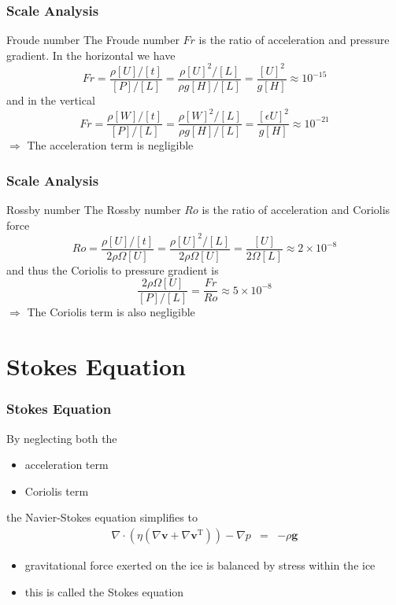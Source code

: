 \documentclass[hide notes,intlimits]{beamer}
\begin{document}
\begin{frame}
  \frametitle{Scale Analysis}
  \begin{block}{Froude number}
    The \alert{Froude number $Fr$} is the ratio of acceleration and pressure gradient. In the horizontal we have
  \begin{equation*}
    Fr = \frac{\rho[U]/[t]}{[P]/[L]} = \frac{\rho[U]^{2}/[L]}{\rho g [H]/[L]} = \frac{[U]^{2}}{g[H]} \approx 10^{-15}
  \end{equation*}
  and in the vertical
  \begin{equation*}
    Fr = \frac{\rho[W]/[t]}{[P]/[L]} = \frac{\rho[W]^{2}/[L]}{\rho g [H]/[L]} = \frac{[\epsilon U]^{2}}{g[H]} \approx 10^{-21}
  \end{equation*}
  $\Rightarrow$ The \alert{acceleration term} is \alert{negligible}
  \end{block}
\end{frame}


\begin{frame}
  \frametitle{Scale Analysis}
  \begin{block}{Rossby number}
    The \alert{Rossby number $Ro$} is the ratio of acceleration and Coriolis force
  \begin{equation*}
    Ro = \frac{\rho[U]/[t]}{2\rho\Omega[U]} = \frac{\rho[U]^{2}/[L]}{2\rho\Omega[U]} = \frac{[U]}{2 \Omega [L]} \approx 2\times10^{-8}
  \end{equation*}
  and thus the Coriolis to pressure gradient is
  \begin{equation*}
   \frac{2\rho\Omega[U]}{[P]/[L]} = \frac{Fr}{Ro}\approx 5 \times 10^{-8}
  \end{equation*}
  $\Rightarrow$ The \alert{Coriolis term} is also \alert{negligible}
  \end{block}
\end{frame}


\section{Stokes Equation}


\begin{frame}
  \frametitle{Stokes Equation}
  By neglecting both the
  \begin{itemize}
  \item acceleration term
  \item Coriolis term
  \end{itemize}
  the Navier-Stokes equation simplifies to
  \begin{eqnarray}
     \nabla \cdot \left(\eta\left(\nabla \mathbf{v} + \nabla \mathbf{v}^{\text{T}}\right)\right) - \nabla p & = & - \rho \mathbf{g}
  \end{eqnarray}
  \begin{itemize}
  \item gravitational force exerted on the ice is balanced by stress within the ice
  \item this is called the \alert{Stokes equation}
  \end{itemize}
\end{frame}
\end{document}
